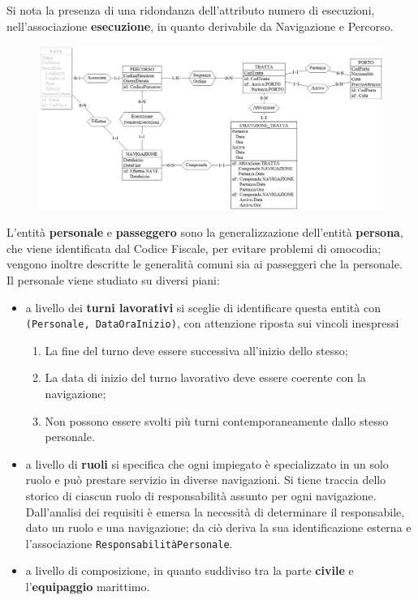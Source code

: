 \documentclass[a4paper, titlepage]{report}
\begin{document}
	\noindent
	Si nota la presenza di una ridondanza dell'attributo numero di esecuzioni, nell'associazione \textbf{esecuzione}, in quanto derivabile da Navigazione e Percorso.
	
    \vspace{0.4cm}
	\begin{figure}[h]
		\centering
		\includegraphics[scale=0.55]{images/Navigazione.png}		
	\end{figure}
	\vspace{0.4cm}
	\noindent
	L'entità \textbf{personale} e \textbf{passeggero} sono la generalizzazione dell'entità \textbf{persona}, che viene identificata dal Codice Fiscale, per evitare problemi di omocodia; vengono inoltre descritte le generalità comuni sia ai passeggeri che la personale. \\ Il personale viene studiato su diversi piani: 
	\begin{itemize}
		\item a livello dei \textbf{turni lavorativi} si sceglie di identificare questa entità con \texttt{(Personale, DataOraInizio)}, con attenzione riposta sui vincoli inespressi
			\begin{enumerate}
			\item La fine del turno deve essere successiva all'inizio dello stesso;
			\item La data di inizio del turno lavorativo deve essere coerente con la navigazione; 
			\item Non possono essere svolti più turni contemporaneamente dallo stesso personale. 
			\end{enumerate}
		\item a livello di \textbf{ruoli} si specifica che ogni impiegato è specializzato in un solo ruolo e può prestare servizio in diverse navigazioni. Si tiene traccia dello storico di ciascun ruolo di responsabilità assunto per ogni  navigazione. Dall'analisi dei requisiti è emersa la necessità di determinare il responsabile, dato un ruolo e una navigazione; da ciò deriva la sua identificazione esterna e l'associazione \texttt{ResponsabilitàPersonale}. 
		\item a livello di composizione, in quanto suddiviso tra la parte \textbf{civile} e l'\textbf{equipaggio} marittimo.
	\end{itemize}
	
\end{document}
